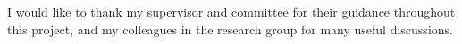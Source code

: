 \begin{acknowledgments}
I would like to thank my supervisor and committee for their guidance throughout
this project, and my colleagues in the research group for many useful discussions.
\end{acknowledgments}
